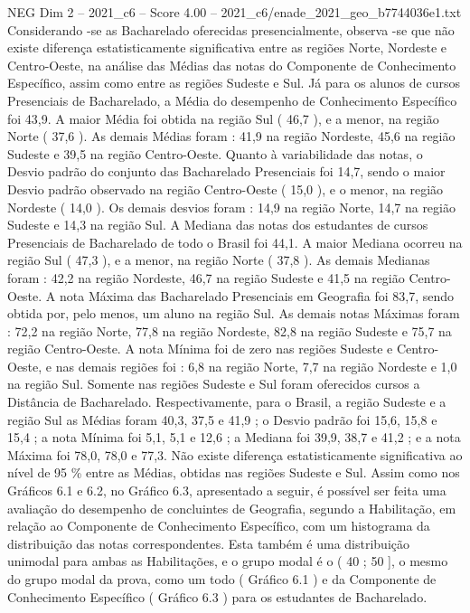 \begin{textsample}{NEG Dim 2 – 2021\_c6 – Score 4.00 – 2021\_c6/enade\_2021\_geo\_b7744036e1.txt}
Considerando -se as Bacharelado oferecidas presencialmente, observa -se que não existe diferença estatisticamente significativa entre as regiões Norte, Nordeste e Centro-Oeste, na análise das Médias das notas do Componente de Conhecimento Específico, assim como entre as regiões Sudeste e Sul.
Já para os alunos de cursos Presenciais de Bacharelado, a Média do desempenho de Conhecimento Específico foi 43,9.
A maior Média foi obtida na região Sul ( 46,7 ), e a menor, na região Norte ( 37,6 ).
As demais Médias foram : 41,9 na região Nordeste, 45,6 na região Sudeste e 39,5 na região Centro-Oeste.
Quanto à variabilidade das notas, o Desvio padrão do conjunto das Bacharelado Presenciais foi 14,7, sendo o maior Desvio padrão observado na região Centro-Oeste ( 15,0 ), e o menor, na região Nordeste ( 14,0 ).
Os demais desvios foram : 14,9 na região Norte, 14,7 na região Sudeste e 14,3 na região Sul.
A Mediana das notas dos estudantes de cursos Presenciais de Bacharelado de todo o Brasil foi 44,1.
A maior Mediana ocorreu na região Sul ( 47,3 ), e a menor, na região Norte ( 37,8 ).
As demais Medianas foram : 42,2 na região Nordeste, 46,7 na região Sudeste e 41,5 na região Centro-Oeste.
A nota Máxima das Bacharelado Presenciais em Geografia foi 83,7, sendo obtida por, pelo menos, um aluno na região Sul.
As demais notas Máximas foram : 72,2 na região Norte, 77,8 na região Nordeste, 82,8 na região Sudeste e 75,7 na região Centro-Oeste.
A nota Mínima foi de zero nas regiões Sudeste e Centro-Oeste, e nas demais regiões foi : 6,8 na região Norte, 7,7 na região Nordeste e 1,0 na região Sul.
Somente nas regiões Sudeste e Sul foram oferecidos cursos a Distância de Bacharelado.
Respectivamente, para o Brasil, a região Sudeste e a região Sul as Médias foram 40,3, 37,5 e 41,9 ; o Desvio padrão foi 15,6, 15,8 e 15,4 ; a nota Mínima foi 5,1, 5,1 e 12,6 ; a Mediana foi 39,9, 38,7 e 41,2 ; e a nota Máxima foi 78,0, 78,0 e 77,3.
Não existe diferença estatisticamente significativa ao nível de 95 \% entre as Médias, obtidas nas regiões Sudeste e Sul.
Assim como nos Gráficos 6.1 e 6.2, no Gráfico 6.3, apresentado a seguir, é possível ser feita uma avaliação do desempenho de concluintes de Geografia, segundo a Habilitação, em relação ao Componente de Conhecimento Específico, com um histograma da distribuição das notas correspondentes.
Esta também é uma distribuição unimodal para ambas as Habilitações, e o grupo modal é o ( 40 ; 50 ], o mesmo do grupo modal da prova, como um todo ( Gráfico 6.1 ) e da Componente de Conhecimento Específico ( Gráfico 6.3 ) para os estudantes de Bacharelado.

\end{textsample}
